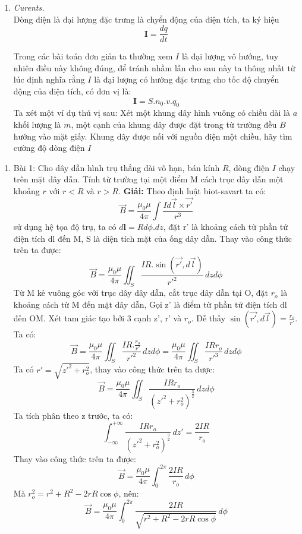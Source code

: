 \begin{enumerate}
\item \textit{Curents.}\\
Dòng điện là đại lượng đặc trưng là chyển động của điện tích, ta ký hiệu
\[
\mathbf{I} = \frac{dq}{dt}
\]

Trong các bài toán đơn giản ta thường xem $I$ là đại lượng vô hướng, tuy nhiên điều này không đúng, để tránh nhầm lẫn cho sau này ta thông nhất từ lúc định nghĩa rằng $I$ là đại lượng có hướng đặc trưng cho tốc độ chuyển động của điện tích, có đơn vị là:
\[
\mathbf{I} = S.n_{0}.v.q_{0}
\]
Ta xét một ví dụ thú vị sau: Xét một khung dây hình vuông có chiều dài là $a$ khối lượng là $m$, một cạnh của khung dây được đặt trong từ trường đều $B$ hướng vào mặt giấy. Khung dây được nối với nguồn điện một chiều, hãy tìm cường độ dòng điện $I$
\end{enumerate}

\begin{enumerate}
  \item{Bài 1:} Cho dây dẫn hình trụ thẳng dài vô hạn, bán kính $R$, dòng điện $I$ chạy trên mặt dây dẫn. Tính từ trường tại một điểm M cách trục dây dẫn một khoảng $r$ với $r < R$ và $r > R$.
\textbf{Giải:} Theo định luật biot-savart ta có:
\[\vec{B} = \frac{\mu_0 \mu}{4\pi}\int \frac{I d\vec{l} \times \vec{r'}}{r^3}\]
sử dụng hệ tọa độ trụ, ta có $d\mathbf{l} = R d\phi . dz$, đặt r' là khoảng cách từ phần tử điện tích dl đến M, S là diện tích mặt của ống dây dẫn. Thay vào công thức trên ta được:
\[
\vec{B} = \frac{\mu_0 \mu}{4\pi} \iint_S \frac{IR . \sin(\vec{r'}, d\vec{l})}{r'^2} \, dzd\phi
\]
Từ M kẻ vuông góc với trục dây dây dẫn, cắt trục dây dẫn tại O, đặt $r_{o}$ là khoảng cách từ M đến mặt dây dẫn, Gọi z' là điểm từ phần tử điện tích dl đến OM. Xét tam giác tạo bởi 3 cạnh z', r' và $r_{o}$. Dễ thấy $\sin(\vec{r'}, d\vec{l}) = \frac{r_{o}}{r'}$. Ta có:
\[\vec{B} = \frac{\mu_0 \mu}{4\pi}\iint_S \frac{IR . \frac{r_{o}}{r'}}{r'^{2}} \, dzd\phi = \frac{\mu_0 \mu}{4\pi}\iint_S \frac{IR r_{o}}{r'^{3}} \,dzd\phi\]
Ta có $r' = \sqrt{z'^2 + r_{o}^2}$, thay vào công thức trên ta được:
\[\vec{B} = \frac{\mu_0 \mu}{4\pi}\iint_S \frac{IR r_{o}}{(z'^2 + r_{o}^2)^{\frac{3}{2}}} \, dzd\phi\]
Ta tích phân theo z trước, ta có:
\[\int_{-\infty}^{+\infty} \frac{IR r_{o}}{(z'^2 + r_{o}^2)^{\frac{3}{2}}} \, dz' = \frac{2IR}{r_{o}}\]
Thay vào công thức trên ta được:
\[\vec{B} = \frac{\mu_0 \mu}{4\pi}\int_0^{2\pi} \frac{2IR}{r_{o}} \, d\phi\]
Mà $r_{o}^2 = r^2 + R^2 -2 rR\cos\phi$, nên:
\[\vec{B} = \frac{\mu_0 \mu}{4\pi}\int_0^{2\pi} \frac{2IR}{\sqrt{r^2 + R^2 - 2 rR\cos\phi}} \, d\phi\]
\end{enumerate}


